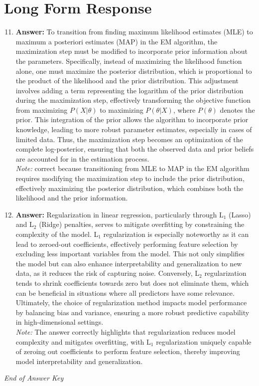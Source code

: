 \documentclass[12pt]{article}
\begin{document}
\section*{Long Form Response}
\begin{enumerate}[label=\arabic*.]
\setcounter{enumi}{10}
\item \textbf{Answer:} To transition from finding maximum likelihood estimates (MLE) to maximum a posteriori estimates (MAP) in the EM algorithm, the maximization step must be modified to incorporate prior information about the parameters. Specifically, instead of maximizing the likelihood function alone, one must maximize the posterior distribution, which is proportional to the product of the likelihood and the prior distribution. This adjustment involves adding a term representing the logarithm of the prior distribution during the maximization step, effectively transforming the objective function from maximizing \( P(X | \theta) \) to maximizing \( P(\theta | X) \), where \( P(\theta) \) denotes the prior. This integration of the prior allows the algorithm to incorporate prior knowledge, leading to more robust parameter estimates, especially in cases of limited data. Thus, the maximization step becomes an optimization of the complete log-posterior, ensuring that both the observed data and prior beliefs are accounted for in the estimation process.
\\ \textit{Note:} correct because transitioning from MLE to MAP in the EM algorithm requires modifying the maximization step to include the prior distribution, effectively maximizing the posterior distribution, which combines both the likelihood and the prior information.
\item \textbf{Answer:} Regularization in linear regression, particularly through L$_{1}$ (Lasso) and L$_{2}$ (Ridge) penalties, serves to mitigate overfitting by constraining the complexity of the model. L$_{1}$ regularization is especially noteworthy as it can lead to zeroed-out coefficients, effectively performing feature selection by excluding less important variables from the model. This not only simplifies the model but can also enhance interpretability and generalization to new data, as it reduces the risk of capturing noise. Conversely, L$_{2}$ regularization tends to shrink coefficients towards zero but does not eliminate them, which can be beneficial in situations where all predictors have some relevance. Ultimately, the choice of regularization method impacts model performance by balancing bias and variance, ensuring a more robust predictive capability in high-dimensional settings.
\\ \textit{Note:} The answer correctly highlights that regularization reduces model complexity and mitigates overfitting, with L$_{1}$ regularization uniquely capable of zeroing out coefficients to perform feature selection, thereby improving model interpretability and generalization.
\end{enumerate}

\vfill
\noindent\textit{End of Answer Key}
\end{document}
